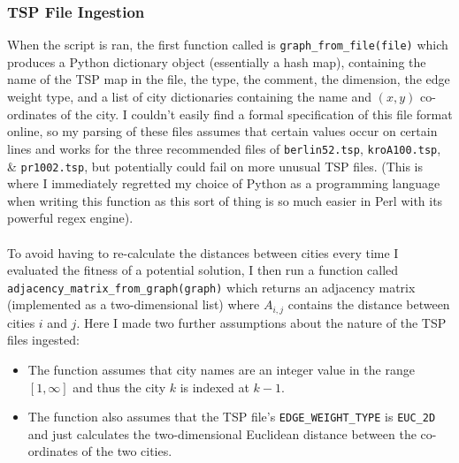 \documentclass[a4paper]{article}
\begin{document}
\subsubsection{TSP File Ingestion}
When the script is ran, the first function called is \texttt{graph_from_file(file)} which produces a Python dictionary object (essentially a hash map), containing the name of the TSP map in the file, the type, the comment, the dimension, the edge weight type, and a list of city dictionaries containing the name and $(x,y)$ co-ordinates of the city.
I couldn't easily find a formal specification of this file format online, so my parsing of these files assumes that certain values occur on certain lines and works for the three recommended files of \verb|berlin52.tsp|, \verb|kroA100.tsp|, \& \verb|pr1002.tsp|, but potentially could fail on more unusual TSP files.
(This is where I immediately regretted my choice of Python as a programming language when writing this function as this sort of thing is so much easier in Perl with its powerful regex engine).
\\\\
To avoid having to re-calculate the distances between cities every time I evaluated the fitness of a potential solution, I then run a function called \texttt{adjacency_matrix_from_graph(graph)} which returns an adjacency matrix (implemented as a two-dimensional list) where $A_{i,j}$ contains the distance between cities $i$ and $j$.
Here I made two further assumptions about the nature of the TSP files ingested:
\begin{itemize}
    \item   The function assumes that city names are an integer value in the range $[1, \infty]$ and thus the city $k$ is indexed at $k-1$.
    \item   The function also assumes that the TSP file's \verb|EDGE_WEIGHT_TYPE| is \verb|EUC_2D| and just calculates the two-dimensional Euclidean distance between the co-ordinates of the two cities.
\end{itemize}
\end{document}
